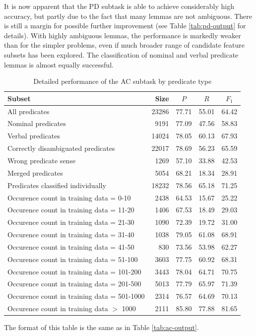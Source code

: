 \documentclass[12pt,notitlepage,a4paper]{report}
\begin{document}
It is now apparent that the PD subtask is able to achieve considerably high accuracy, but partly due to the fact that many lemmas are not ambiguous. There is still a margin for possible further improvement (see Table \ref{tab:pd-output} for details). With highly ambiguous lemmas, the performance is markedly weaker than for the simpler problems, even if much broader range of candidate feature subsets has been explored. The classification of nominal and verbal predicate lemmas is almost equally successful.

\begin{table}[htb]\footnotesize
\caption{Detailed performance of the AC subtask by predicate type}\label{tab:ac-preds}
\begin{center}
\begin{tabular}{|l|r|c|c|c|}\hline
\bf Subset & \bf Size & $P$ & $R$ & $F_1$ \\\hline\hline
All predicates & 23286 & 77.71 & 55.01 & 64.42 \\\hline
Nominal predicates & 9191 & 77.09 & 47.56 & 58.83 \\
Verbal predicates & 14024 & 78.05 & 60.13 & 67.93 \\\hline
Correctly disambiguated predicates & 22017 & 78.69 & 56.23 & 65.59 \\
Wrong predicate sense & 1269 & 57.10 & 33.88 & 42.53 \\\hline\hline
Merged predicates & 5054 & 68.21 & 18.34 & 28.91 \\
Predicates classified individually & 18232 & 78.56 & 65.18 & 71.25 \\\hline
Occurence count in training data = \hfill 0-10 & 2438 & 64.53 & 15.67 & 25.22 \\
Occurence count in training data = \hfill 11-20 & 1406 & 67.53 & 18.49 & 29.03 \\
Occurence count in training data = \hfill 21-30 & 1090 & 72.39 & 19.72 & 31.00 \\
Occurence count in training data = \hfill 31-40 & 1038 & 79.05 & 61.08 & 68.91 \\
Occurence count in training data = \hfill 41-50 & 830 & 73.56 & 53.98 & 62.27 \\
Occurence count in training data = \hfill 51-100 & 3603 & 77.75 & 60.92 & 68.31 \\
Occurence count in training data = \hfill 101-200 & 3443 & 78.04 & 64.71 & 70.75 \\
Occurence count in training data = \hfill 201-500 & 5013 & 77.79 & 65.97 & 71.39 \\
Occurence count in training data = \hfill 501-1000 & 2314 & 76.57 & 64.69 & 70.13 \\
Occurence count in training data $>$ \hfill 1000 & 2111 & 85.80 & 77.88 & 81.65 \\\hline
\end{tabular}
\end{center}
The format of this table is the same as in Table \ref{tab:ac-output}.
\end{table}
\end{document}
